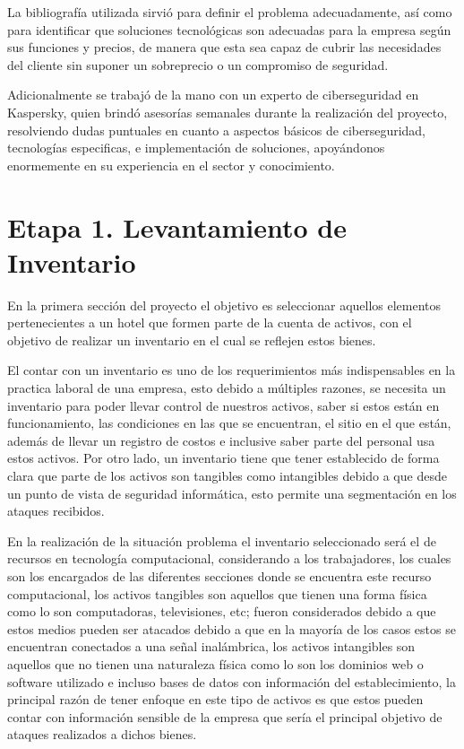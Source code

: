 \documentclass[10pt]{article}
\begin{document}
La bibliografía utilizada sirvió para definir el problema adecuadamente, así como para identificar que soluciones tecnológicas son adecuadas para la empresa según sus funciones y precios, de manera que esta sea capaz de cubrir las necesidades del cliente sin suponer un sobreprecio o un compromiso de seguridad.


Adicionalmente se trabajó de la mano con un experto de ciberseguridad en Kaspersky, quien brindó asesorías semanales durante la realización del proyecto, resolviendo dudas puntuales en cuanto a aspectos básicos de ciberseguridad, tecnologías especificas, e implementación de soluciones, apoyándonos enormemente en su experiencia en el sector y conocimiento. 






\section{Etapa 1.  Levantamiento de Inventario}
En la primera sección del proyecto el objetivo es seleccionar aquellos elementos pertenecientes a un hotel que formen parte de la cuenta de activos, con el objetivo de realizar un inventario en el cual se reflejen estos bienes. 


El contar con un inventario es uno de los requerimientos más indispensables en la practica laboral de una empresa, esto debido a múltiples razones, se necesita un inventario para poder llevar control de nuestros activos, saber si estos están en funcionamiento, las condiciones en las que se encuentran, el sitio en el que están, además de llevar un registro de costos e inclusive saber parte del personal usa estos activos. Por otro lado, un inventario tiene que tener establecido de forma clara que parte de los activos son tangibles como intangibles debido a que desde un punto de vista de seguridad informática, esto permite una segmentación en los ataques recibidos. 


En la realización de la situación problema el inventario seleccionado será el de recursos en tecnología computacional, considerando a los trabajadores, los cuales son los encargados de las diferentes secciones donde se encuentra este recurso computacional, los activos tangibles son aquellos que tienen una forma física como lo son computadoras, televisiones, etc; fueron considerados debido a que estos medios pueden ser atacados debido a que en la mayoría de los casos estos se encuentran conectados a una señal inalámbrica, los activos intangibles son aquellos que no tienen una naturaleza física como lo son los dominios web o software utilizado e incluso bases de datos con información del establecimiento, la principal razón de tener enfoque en este tipo de activos es que estos pueden contar con información sensible de la empresa que sería el principal objetivo de ataques realizados a dichos bienes.
\end{document}
